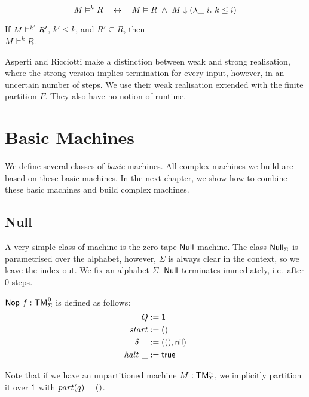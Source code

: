 \begin{lemma}
  \label{lem:Realise_total}
  \[
    M \mathrel{\vDash^{k}} R
    \quad\mathbin{\leftrightarrow}\quad
    M \mathrel{\vDash} R ~\land~
    M \mathrel{\downarrow} (\lambda \_~i.~k \le i)
  \]
\end{lemma}

\begin{lemma}
  \label{lem:RealiseIn_monotone}
  If $M \mathrel{\vDash^{k'}} R'$, $k' \leq k$, and $R' \subseteq R$, then \\
  $M \mathrel{\vDash^{k}} R$.
\end{lemma}

Asperti and Ricciotti \cite{asperti2015} make a distinction between weak and strong realisation, where the strong version implies termination for
every input, however, in an uncertain number of steps.  We use their weak realisation extended with the finite partition $F$.  They also have no
notion of runtime.


\section{Basic Machines}
\label{sec:basic_machines}

We define several classes of \emph{basic} machines.  All complex machines we build are based on these basic machines.  In the next chapter, we show
how to combine these basic machines and build complex machines.

\subsection{Null}
\label{sec:Null}

A very simple class of machine is the zero-tape $\mathsf{Null}$ machine.  The class $\mathsf{Null}_\Sigma$ is parametrised over the alphabet, however,
$\Sigma$ is always clear in the context, so we leave the index out.  We fix an alphabet $\Sigma$.  $\mathsf{Null}$ terminates immediately, i.e.\ after $0$
steps.

\begin{definition}[Null]
  \label{def:Null}
  $\MS{Nop}~f: \TM_\Sigma^{\mkern+1mu 0}$ is defined as follows:
  \begin{align*}
    Q          &:= \mathsf{1} \\
    start      &:= \mathsf{()} \\
    \delta ~\_ &:= (\mathsf{()}, \mathsf{nil}) \\
    halt   ~\_ &:= \mathsf{true}
  \end{align*}
\end{definition}
Note that if we have an unpartitioned machine $M:\mathsf{TM}_\Sigma^n$, we implicitly partition it over $\mathsf{1}$ with $part(q)=\mathsf{()}$.

